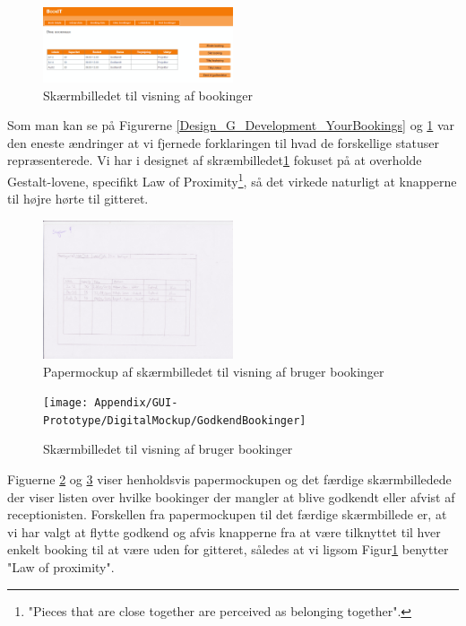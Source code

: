 \begin{figure}[h!]
  \centering
    \includegraphics[width=0.5\textwidth]{Appendix/GUI-Prototype/DigitalMockup/DineBookinger}
  \caption{Skærmbilledet til visning af bookinger}
\label{Design_G_Development_YourBookings_Final}
\end{figure} 

Som man kan se på Figurerne \ref{Design_G_Development_YourBookings} og \ref{Design_G_Development_YourBookings_Final} var den eneste ændringer at vi fjernede forklaringen til hvad de forskellige statuser repræsenterede. Vi har i designet af skræmbilledet\ref{Design_G_Development_YourBookings_Final} fokuset på at overholde Gestalt-lovene\cite[s. 68]{SL_UID}, specifikt Law of Proximity\footnote{"Pieces that are close together are perceived as belonging together".}, så det virkede naturligt at knapperne til højre hørte til gitteret. 

\begin{figure}[h!]
  \centering
    \includegraphics[width=0.5\textwidth]{Appendix/GUI-Prototype/PaperMockup/GodkendBookinger_001}
  \caption{Papermockup af skærmbilledet til visning af bruger bookinger}
\label{Design_G_Development_ApproveBookings}
\end{figure} 

\begin{figure}[h!]
  \centering
    \texttt{[image: Appendix/GUI-Prototype/DigitalMockup/GodkendBookinger]}
  \caption{Skærmbilledet til visning af bruger bookinger}
\label{Design_G_Development_ApproveBookings_Final}
\end{figure}

Figuerne \ref{Design_G_Development_ApproveBookings} og \ref{Design_G_Development_ApproveBookings_Final} viser henholdsvis papermockupen og det færdige skærmbilledede der viser listen over hvilke bookinger der mangler at blive godkendt eller afvist af receptionisten. Forskellen fra papermockupen til det færdige skærmbillede er, at vi har valgt at flytte godkend og afvis knapperne fra at være tilknyttet til hver enkelt booking til at være uden for gitteret, således at vi ligsom Figur\ref{Design_G_Development_YourBookings_Final} benytter "Law of proximity".

